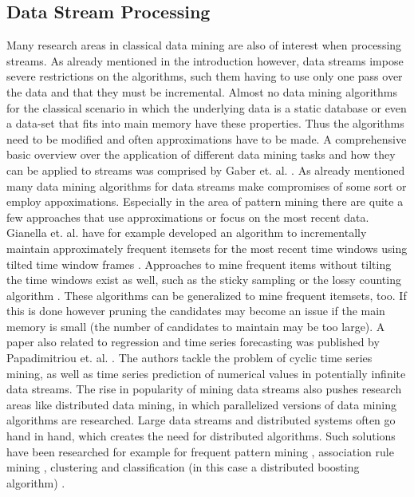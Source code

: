\subsection{Data Stream Processing}
\label{subsec_dataStreamProcessing}
Many research areas in classical data mining are also of interest when processing streams. As already mentioned in the introduction however, data streams impose severe restrictions on the algorithms, such them having to use only one pass over the data and that they must be incremental. Almost no data mining algorithms for the classical scenario in which the underlying data is a static database or even a data-set that fits into main memory have these properties. Thus the algorithms need to be modified and often approximations have to be made. A comprehensive basic overview over the application of different data mining tasks and how they can be applied to streams was comprised by Gaber et. al. \cite{gaber2005mining}. \newline
As already mentioned many data mining algorithms for data streams make compromises of some sort or employ appoximations. Especially in the area of pattern mining there are quite a few approaches that use approximations or focus on the most recent data. Gianella et. al. have for example developed an algorithm to incrementally maintain approximately frequent itemsets for the most recent time windows using tilted time window frames \cite{giannella2003mining}. Approaches to mine frequent items without tilting the time windows exist as well, such as the sticky sampling or the lossy counting algorithm \cite{manku2002approximate}. These algorithms can be generalized to mine frequent itemsets, too. If this is done however pruning the candidates may become an issue if the main memory is small (the number of candidates to maintain may be too large). \newline
A paper also related to regression and time series forecasting was published by Papadimitriou et. al. \cite{papadimitriou2003adaptive}. The authors tackle the problem of cyclic time series mining, as well as time series prediction of numerical values in potentially infinite data streams. \newline
The rise in popularity of mining data streams also pushes research areas like distributed data mining, in which parallelized versions of data mining algorithms are researched. Large data streams and distributed systems often go hand in hand, which creates the need for distributed algorithms. Such solutions have been researched for example for frequent pattern mining \cite{lin2015fast}, association rule mining \cite{ashrafi2004odam}, clustering \cite{januzaj2004dbdc} and classification (in this case a distributed boosting algorithm) \cite{lazarevic2001distributed}. \newline
